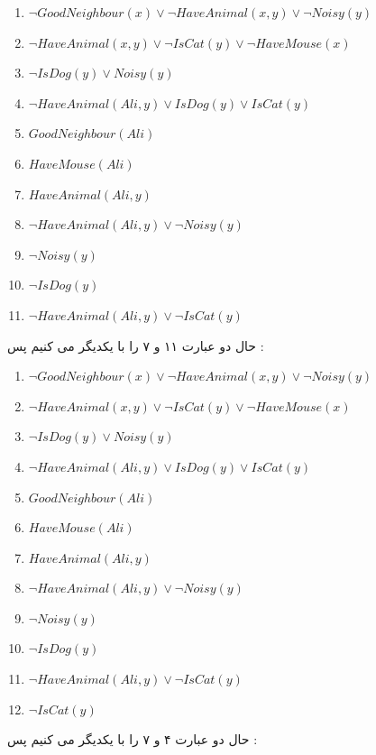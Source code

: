 \documentclass{article}
\begin{document}
\begin{center}
	\begin{enumerate}
		\item $ \neg GoodNeighbour(x) \lor\neg HaveAnimal(x,y)  \lor \neg Noisy(y)$
		\item $ \neg HaveAnimal(x,y) \lor \neg IsCat(y)\lor \neg HaveMouse(x)$
		\item $ \neg IsDog(y) \lor Noisy(y)$
		\item $ \neg HaveAnimal(Ali,y) \lor IsDog(y) \lor IsCat(y)$
		\item $ GoodNeighbour(Ali)$
		\item $HaveMouse(Ali)$
		\item $HaveAnimal(Ali,y)$
		\item $\neg HaveAnimal(Ali,y) \lor \neg Noisy(y)$
		\item $ \neg Noisy(y)$
		\item $\neg IsDog(y)$
		\item $\neg HaveAnimal(Ali,y) \lor \neg IsCat(y)$
	\end{enumerate}
\end{center}
حال دو عبارت ۱۱ و ۷ را با یکدیگر 
می کنیم پس : 
\begin{center}
	\begin{enumerate}
		\item $ \neg GoodNeighbour(x) \lor\neg HaveAnimal(x,y)  \lor \neg Noisy(y)$
		\item $ \neg HaveAnimal(x,y) \lor \neg IsCat(y)\lor \neg HaveMouse(x)$
		\item $ \neg IsDog(y) \lor Noisy(y)$
		\item $ \neg HaveAnimal(Ali,y) \lor IsDog(y) \lor IsCat(y)$
		\item $ GoodNeighbour(Ali)$
		\item $HaveMouse(Ali)$
		\item $HaveAnimal(Ali,y)$
		\item $\neg HaveAnimal(Ali,y) \lor \neg Noisy(y)$
		\item $ \neg Noisy(y)$
		\item $\neg IsDog(y)$
		\item $\neg HaveAnimal(Ali,y) \lor \neg IsCat(y)$
		\item $\neg IsCat(y)$
	\end{enumerate}
\end{center}
حال دو عبارت ۴ و ۷ را با یکدیگر 
می کنیم پس : 
\end{document}
